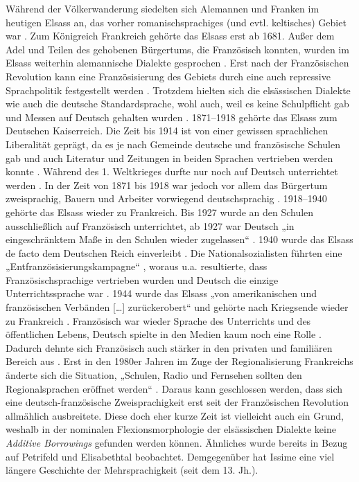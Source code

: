 Während der Völkerwanderung siedelten sich Alemannen und Franken im heutigen Elsass an, das vorher romanischsprachiges (und evtl. keltisches) Gebiet war \citep[2]{Lösch1997}. Zum Königreich Frankreich gehörte das Elsass erst ab 1681. Außer dem Adel und Teilen des gehobenen Bürgertums, die Französisch konnten, wurden im Elsass weiterhin alemannische Dialekte gesprochen \citep[7]{Lösch1997}. Erst nach der Französischen Revolution kann eine Französisierung des Gebiets durch eine auch repressive Sprachpolitik festgestellt werden \citep[7--10]{Lösch1997}. Trotzdem hielten sich die elsässischen Dialekte wie auch die deutsche Standardsprache, wohl auch, weil es keine Schulpflicht gab und Messen auf Deutsch gehalten wurden \citep[10--11]{Lösch1997}. 1871–1918 gehörte das Elsass zum Deutschen Kaiserreich. Die Zeit bis 1914 ist von einer gewissen sprachlichen Liberalität geprägt, da es je nach Gemeinde deutsche und französische Schulen gab und auch Literatur und Zeitungen in beiden Sprachen vertrieben werden konnte \citep[12]{Lösch1997}. Während des 1. Weltkrieges durfte nur noch auf Deutsch unterrichtet werden \citep[16]{Lösch1997}. In der Zeit von 1871 bis 1918 war jedoch vor allem das Bürgertum zweisprachig, Bauern und Arbeiter vorwiegend deutschsprachig \citep[13]{Lösch1997}. 1918–1940 gehörte das Elsass wieder zu Frankreich. Bis 1927 wurde an den Schulen ausschließlich auf Französisch unterrichtet, ab 1927 war Deutsch „in eingeschränktem Maße in den Schulen wieder zugelassen“ \citep[18]{Lösch1997}. 1940 wurde das Elsass de facto dem Deutschen Reich einverleibt \citep[20]{Lösch1997}. Die Nationalsozialisten führten eine „Entfranzösisierungskampagne“ \citep[20]{Lösch1997}, woraus u.a. resultierte, dass Französischsprachige vertrieben wurden und Deutsch die einzige Unterrichtssprache war \citep[21]{Lösch1997}. 1944 wurde das Elsass „von amerikanischen und französischen Verbänden […] zurückerobert“ und gehörte nach Kriegsende wieder zu Frankreich \citep[21]{Lösch1997}. Französisch war wieder Sprache des Unterrichts und des öffentlichen Lebens, Deutsch spielte in den Medien kaum noch eine Rolle \citep[22]{Lösch1997}. Dadurch dehnte sich Französisch auch stärker in den privaten und familiären Bereich aus \citep[25]{Lösch1997}. Erst in den 1980er Jahren im Zuge der Regionalisierung Frankreichs änderte sich die Situation, „Schulen, Radio und Fernsehen sollten den Regionalsprachen eröffnet werden“ \citep[26]{Lösch1997}. Daraus kann geschlossen werden, dass sich eine deutsch-französische Zweisprachigkeit erst seit der Französischen Revolution allmählich ausbreitete. Diese doch eher kurze Zeit ist vielleicht auch ein Grund, weshalb in der nominalen Flexionsmorphologie der elsässischen Dialekte keine \textit{Additive Borrowings} gefunden werden können. Ähnliches wurde bereits in Bezug auf Petrifeld und Elisabethtal beobachtet. Demgegenüber hat Issime eine viel längere Geschichte der Mehrsprachigkeit (seit dem 13. Jh.).

